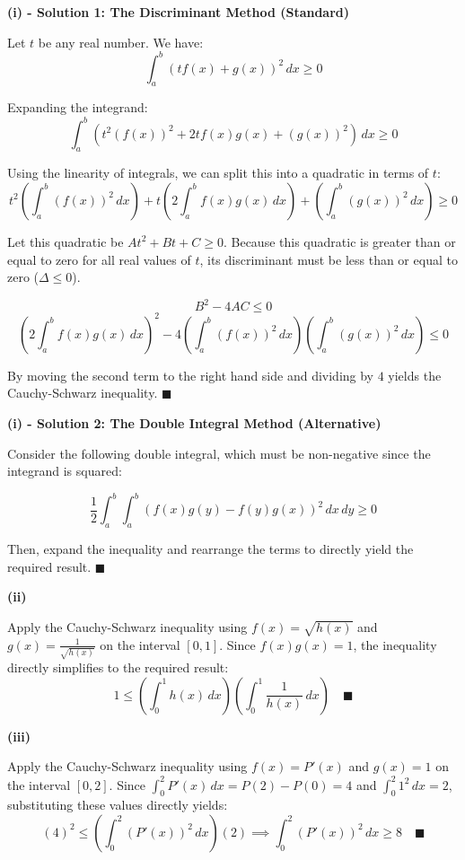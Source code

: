 \begin{solution}

\textbf{ (i) - Solution 1: The Discriminant Method (Standard)}

Let $t$ be any real number. We have: 
$$\int_a^b (t f(x) + g(x))^2 \, dx \ge 0$$

Expanding the integrand:
$$\int_a^b \left( t^2 (f(x))^2 + 2t f(x)g(x) + (g(x))^2 \right) \, dx \ge 0$$

Using the linearity of integrals, we can split this into a quadratic in terms of $t$:
$$t^2 \left( \int_a^b (f(x))^2 \, dx \right) + t \left( 2\int_a^b f(x)g(x) \, dx \right) + \left( \int_a^b (g(x))^2 \, dx \right) \ge 0$$

Let this quadratic be $At^2 + Bt + C \ge 0$.
Because this quadratic is greater than or equal to zero for all real values of $t$, its discriminant must be less than or equal to zero ($\Delta \le 0$).

$$B^2 - 4AC \le 0$$
$$\left( 2\int_a^b f(x)g(x) \, dx \right)^2 - 4 \left( \int_a^b (f(x))^2 \, dx \right) \left( \int_a^b (g(x))^2 \, dx \right) \le 0$$

By moving the second term to the right hand side 
and dividing by $4$ yields the Cauchy-Schwarz inequality. $\blacksquare$

\vspace*{1em}

\textbf{ (i) - Solution 2: The Double Integral Method (Alternative)}

Consider the following double integral, which must be non-negative since the integrand is squared:

$$\frac{1}{2} \int_a^b \int_a^b (f(x)g(y) - f(y)g(x))^2 \, dx \, dy \ge 0$$

Then, expand the inequality and rearrange the terms to directly yield the required result. $\blacksquare$

\vspace*{1em}

\textbf{ (ii)}

Apply the Cauchy-Schwarz inequality using $f(x) = \sqrt{h(x)}$ and $g(x) = \frac{1}{\sqrt{h(x)}}$ on the interval $[0, 1]$. Since $f(x)g(x) = 1$, the inequality directly simplifies to the required result:
$$1 \le \left( \int_0^1 h(x) \, dx \right) \left( \int_0^1 \frac{1}{h(x)} \, dx \right) \quad \blacksquare$$

\vspace*{1em}

\textbf{ (iii)}

Apply the Cauchy-Schwarz inequality using $f(x) = P'(x)$ and $g(x) = 1$ on the interval $[0, 2]$. Since $\int_0^2 P'(x) \, dx = P(2) - P(0) = 4$ and $\int_0^2 1^2 \, dx = 2$, substituting these values directly yields:
$$(4)^2 \le \left( \int_0^2 (P'(x))^2 \, dx \right) (2) \implies \int_0^2 (P'(x))^2 \, dx \ge 8 \quad \blacksquare$$
\end{solution}

